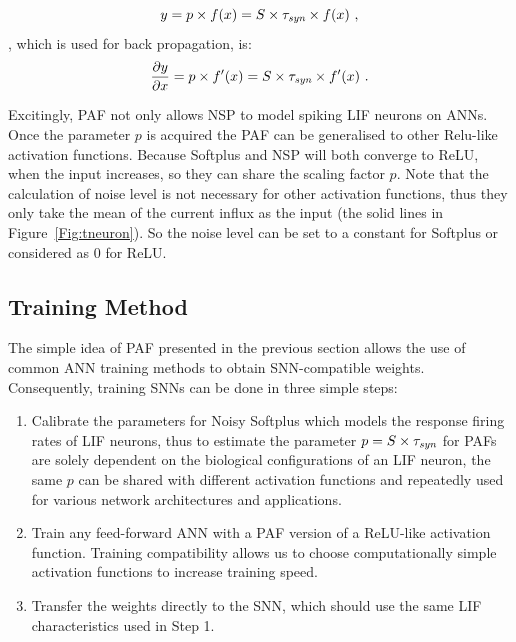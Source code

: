 \DIFdelend \begin{equation}
	y = p \times f(x) = S \times \tau_{\textit{\textrm{syn}}} \times f(x)~,
	\label{equ:PAF}
	\end{equation}
	\DIFdelbegin {}\DIFdelend \DIFaddbegin {}\DIFaddend , which is used for back propagation, is:
	\begin{equation}
	\frac{\partial y}{\partial x} = p \times f'(x) = S \times \tau_{\textit{\textrm{syn}}} \times f'(x)~.
	\end{equation}

	Excitingly, PAF not only allows NSP to model spiking LIF neurons on ANNs.
	Once the parameter $p$ is acquired the PAF can be generalised to other Relu-like activation functions.
	Because Softplus and NSP will both converge to ReLU, when the input increases, so they can share the scaling factor $p$.
	Note that the calculation of noise level is not necessary for other activation functions, thus they only take the mean of the current influx as the input (the solid lines in Figure~\ref{Fig:tneuron}).
	So the noise level can be set to a constant for Softplus or considered as 0 for ReLU.

	\subsection{Training Method}
	\label{subsec:ns_train}

	The simple idea of PAF presented in the previous section allows the use of common ANN training methods to obtain SNN-compatible weights.
	Consequently, training SNNs can be done in three simple steps: 
	 \begin{enumerate} 
		\item Calibrate the parameters \DIFdelbegin {}\DIFdelend \DIFaddbegin {}\DIFaddend for Noisy Softplus which models the response firing rates of LIF neurons, thus to estimate the parameter $p=S \times \tau_{\textit{\textrm{syn}}}$ for PAFs \DIFdelbegin {}\DIFdelend \DIFaddbegin {}\DIFaddend are solely dependent on the biological configurations of an LIF neuron, the same $p$ can be shared with different activation functions and repeatedly used for various network architectures and applications.
		\item Train any feed-forward ANN with a PAF version of a ReLU-like activation function.
		Training compatibility allows us to choose computationally simple activation functions to increase training speed.
		\item Transfer the weights directly to the SNN, which should use the same LIF characteristics used in Step 1.
	 \end{enumerate} 

